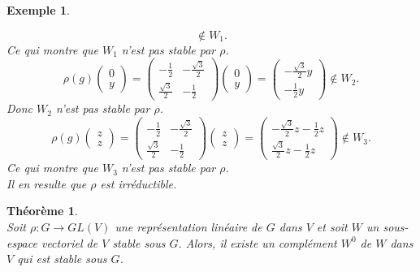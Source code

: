\documentclass[a4paper, 14pt]{report}
\newtheorem{example}{Exemple}[section]
\newtheorem{theorem}{Théorème}[section]
\begin{document}
\begin{onehalfspace}
{\begin{example}
\begin{enumerate}
\[		\notin W_1.
		\]
		Ce qui montre que \(W_1\) n'est pas stable par \(\rho\).		
		\[
		\rho(g) \begin{pmatrix} 0 \\ y \end{pmatrix} = 
		\begin{pmatrix} -\frac{1}{2} & -\frac{\sqrt{3}}{2} \\ \frac{\sqrt{3}}{2} & -\frac{1}{2} \end{pmatrix} 
		\begin{pmatrix} 0 \\ y \end{pmatrix} = 
		\begin{pmatrix} -\frac{\sqrt{3}}{2}y \\ -\frac{1}{2}y \end{pmatrix}
		\notin W_2.
		\]
		Donc \(W_2\) n'est pas stable par \(\rho\).
		\[
		\rho(g) \begin{pmatrix} z \\ z \end{pmatrix} = 
		\begin{pmatrix} -\frac{1}{2} & -\frac{\sqrt{3}}{2} \\ \frac{\sqrt{3}}{2} & -\frac{1}{2} \end{pmatrix} 
		\begin{pmatrix} z \\ z \end{pmatrix} = 
		\begin{pmatrix} -\frac{\sqrt{3}}{2}z - \frac{1}{2}z \\ \frac{\sqrt{3}}{2}z - \frac{1}{2}z \end{pmatrix}
		\notin W_3.
		\]
		Ce qui montre que \(W_3\) n'est pas stable par \(\rho\).\\
		Il en resulte que \( \rho \) est irréductible.
	\end{enumerate}
\end{example}


\begin{theorem}\cite{serre1971representation} \\
Soit $\rho : G \to GL(V)$ une représentation linéaire de $G$ dans $V$ et soit 
$W$ un sous-espace vectoriel de $V$ stable sous $G$. Alors, il existe un complément $W^0$ de $W$ dans $V$ qui est stable sous $G$.
\end{theorem}

}
\end{onehalfspace}
\end{document}
